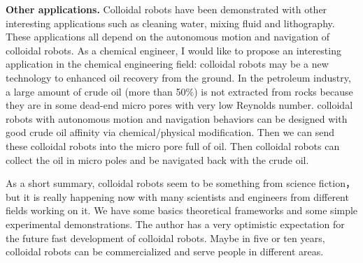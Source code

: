 \textbf{Other applications.} Colloidal robots have been demonstrated with other interesting applications such as cleaning water, mixing fluid and lithography\autocite{soler2014catalytic,fei2019magneto,li2014nanomotor}. These applications all depend on the autonomous motion and navigation of colloidal robots. As a chemical engineer, I would like to propose an interesting application in the chemical engineering field: colloidal robots may be a new technology to enhanced oil recovery from the ground. In the petroleum industry, a large amount of crude oil (more than 50$\%$) is not extracted from rocks because they are in some dead-end micro pores with very low Reynolds number. colloidal robots with autonomous motion and navigation behaviors can be designed with good crude oil affinity via chemical/physical modification. Then we can send these colloidal robots into the micro pore full of oil.  Then colloidal robots  can collect the oil in micro poles and be navigated back with the crude oil.

As a short summary, colloidal robots seem to be something from science fiction， but it is really happening now with many scientists and engineers from different fields working on it. We have some basics theoretical frameworks and some simple experimental demonstrations. The author has a very optimistic expectation for the future fast development of colloidal robots. Maybe in five or ten years, colloidal robots can be commercialized and serve people in different areas.  


